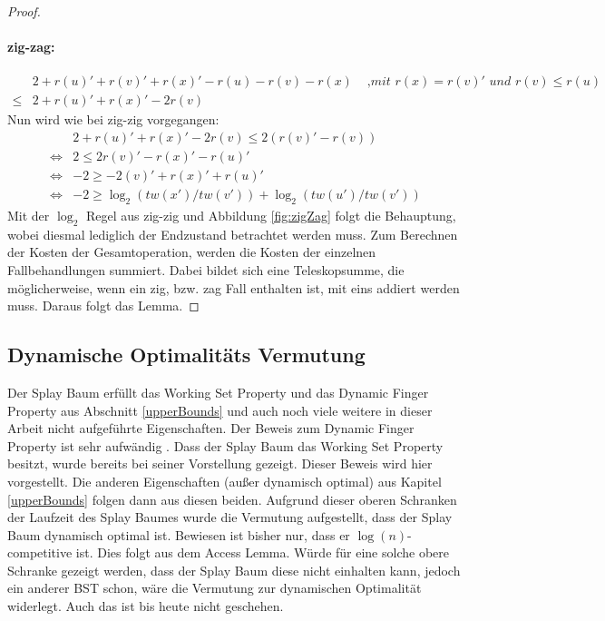 \documentclass[a4paper,12pt]{article}
\begin{document}
\begin{proof}
	\paragraph{zig-zag:} 
	\begin{align*}
	&2 + r\left(u\right)' +r\left(v\right)' +r\left(x\right)' - r\left(u\right)- r\left(v\right)- r\left(x\right) &\textit{ ,mit $r\left(x\right) =  r\left(v\right)'$ und $r\left(v\right) \leq  r\left(u\right)$} \\
	\leq& 2 + r\left(u\right)' +r\left(x\right)' - 2 r\left(v\right)
	\end{align*}
	Nun wird wie bei zig-zig vorgegangen:
	\begin{align*}
	&  2 + r\left(u\right)' +r\left(x\right)' - 2 r\left(v\right) \leq  2\left(r\left(v\right)'- r\left(v\right)\right)\\
	\Leftrightarrow &2 \leq 2r\left(v\right)' -  r\left(x\right)' - r\left(u\right)'\\
	\Leftrightarrow &-2 \geq -2\left(v\right)' +  r\left(x\right)' + r\left(u\right)'\\
	\Leftrightarrow & -2 \geq \log_2\left(\mathit{tw}\left(x'\right) / \mathit{tw}\left(v'\right)\right) + \log_2\left(\mathit{tw}\left(u'\right) / \mathit{tw}\left(v'\right)\right)
	\end{align*}
	Mit der $\log_2$ Regel aus zig-zig und Abbildung \ref{fig:zigZag} folgt die Behauptung, wobei diesmal lediglich der Endzustand betrachtet werden muss.
	Zum Berechnen der Kosten der Gesamtoperation, werden die Kosten der einzelnen Fallbehandlungen summiert. Dabei bildet sich eine Teleskopsumme, die möglicherweise, wenn ein  zig, bzw. zag Fall enthalten ist, mit eins addiert werden muss. Daraus folgt das Lemma.
\end{proof}

\subsection{Dynamische Optimalitäts Vermutung}
Der Splay Baum erfüllt das Working Set Property und das Dynamic Finger Property aus Abschnitt \ref{upperBounds} und auch noch viele weitere in dieser Arbeit nicht aufgeführte Eigenschaften. Der Beweis zum Dynamic Finger Property ist sehr aufwändig \cite{dynFinger}. Dass der Splay Baum das Working Set Property besitzt, wurde bereits bei seiner Vorstellung gezeigt\cite{splay}. Dieser Beweis wird hier vorgestellt. Die anderen Eigenschaften (außer dynamisch optimal) aus Kapitel \ref{upperBounds} folgen dann aus diesen beiden. Aufgrund dieser oberen Schranken der Laufzeit des Splay Baumes wurde die Vermutung aufgestellt, dass der Splay Baum dynamisch optimal ist. Bewiesen ist bisher nur, dass er $\log \left(n\right)$-competitive ist. Dies folgt aus dem Access Lemma. Würde für eine solche obere Schranke gezeigt werden, dass der Splay Baum diese nicht einhalten kann, jedoch ein anderer BST schon, wäre die Vermutung zur dynamischen Optimalität widerlegt. Auch das ist bis heute nicht geschehen. \\
\end{document}
